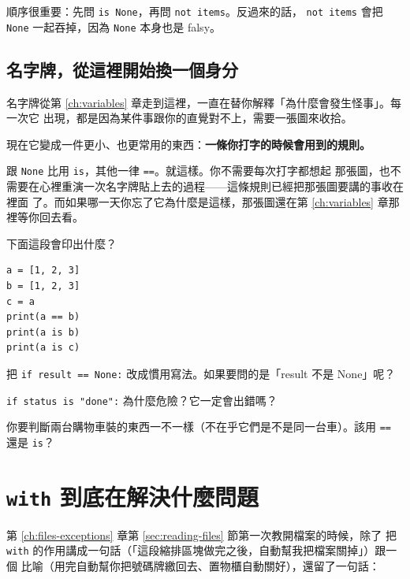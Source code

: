 
順序很重要：先問 \texttt{is None}，再問 \texttt{not items}。反過來的話，
\texttt{not items} 會把 \texttt{None} 一起吞掉，因為 \texttt{None} 本身也是 falsy。

\subsection*{名字牌，從這裡開始換一個身分}

名字牌從第 \ref{ch:variables} 章走到這裡，一直在替你解釋「為什麼會發生怪事」。每一次它
出現，都是因為某件事跟你的直覺對不上，需要一張圖來收拾。

現在它變成一件更小、也更常用的東西：\textbf{一條你打字的時候會用到的規則。}

跟 \texttt{None} 比用 \texttt{is}，其他一律 \texttt{==}。就這樣。你不需要每次打字都想起
那張圖，也不需要在心裡重演一次名字牌貼上去的過程——這條規則已經把那張圖要講的事收在裡面
了。而如果哪一天你忘了它為什麼是這樣，那張圖還在第 \ref{ch:variables} 章那裡等你回去看。

\begin{drills}[label=drills:is-vs-equal]
\item 下面這段會印出什麼？
\begin{verbatim}
a = [1, 2, 3]
b = [1, 2, 3]
c = a
print(a == b)
print(a is b)
print(a is c)
\end{verbatim}
\item 把 \texttt{if result == None:} 改成慣用寫法。如果要問的是「result 不是 None」呢？
\item \texttt{if status is "done":} 為什麼危險？它一定會出錯嗎？
\item 你要判斷兩台購物車裝的東西一不一樣（不在乎它們是不是同一台車）。該用
\texttt{==} 還是 \texttt{is}？
\end{drills}

\section{\texttt{with} 到底在解決什麼問題}
\label{sec:with-explained}

第 \ref{ch:files-exceptions} 章第 \ref{sec:reading-files} 節第一次教開檔案的時候，除了
把 \texttt{with} 的作用講成一句話（「這段縮排區塊做完之後，自動幫我把檔案關掉」）跟一個
比喻（用完自動幫你把號碼牌繳回去、置物櫃自動關好），還留了一句話：

